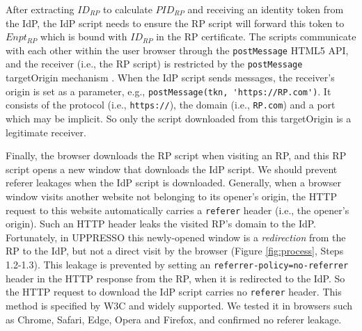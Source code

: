 

After extracting $ID_{RP}$ to calculate $PID_{RP}$
    and receiving an identity token from the IdP,
    the IdP script needs to ensure the RP script will forward this token to $Enpt_{RP}$
        which is bound with $ID_{RP}$ in the RP certificate.
The scripts communicate with each other within the user browser through the \verb+postMessage+ HTML5 API,
and the receiver (i.e., the RP script)
 is restricted by the \verb+postMessage+ targetOrigin mechanism \cite{postm-targeto}.
When the IdP script sends messages,
 the receiver's origin is set as a parameter,
  e.g., \verb+postMessage(tkn, 'https://RP.com')+.
It consists of
    the protocol (i.e., \verb+https://+),
    the domain  (i.e., \verb+RP.com+)
    and a port which may be implicit.
So only the script downloaded from this targetOrigin is a legitimate receiver.


Finally,
    the browser downloads the RP script when visiting an RP,
     and this RP script opens a new window that downloads the IdP script.
We should prevent referer leakages when the IdP script is downloaded.
Generally, when a browser window visits another website not belonging to its opener's origin,
 the HTTP request to this website automatically carries a \verb+referer+ header (i.e., the opener's origin).
Such an HTTP header leaks the visited RP's domain to the IdP.
Fortunately, in UPPRESSO this newly-opened window is a \emph{redirection} from the RP to the IdP,
 but not a direct visit by the browser (Figure \ref{fig:process}, Steps 1.2-1.3).
This leakage is prevented by setting an \verb+referrer-policy=no-referrer+ header in the HTTP response from the RP, when it is redirected to the IdP.
So the HTTP request to download the IdP script carries no \verb+referer+ header.
This method is specified by W3C \cite{referer_policy} and widely supported.
We tested it in browsers such as Chrome, Safari, Edge, Opera and Firefox, and confirmed no referer leakage.




